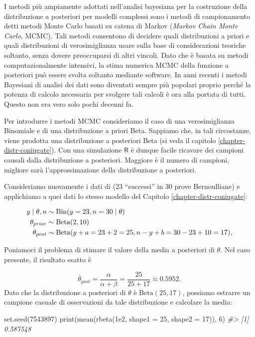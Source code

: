 \documentclass[
  11pt,
]{krantz}
\makeatletter
\newenvironment{Shaded}{\begin{snugshade}}{\end{snugshade}}
\newcommand{\AttributeTok}[1]{\textcolor[rgb]{0.61,0.61,0.61}{#1}}
\newcommand{\CommentTok}[1]{\textcolor[rgb]{0.37,0.37,0.37}{\textit{#1}}}
\newcommand{\DecValTok}[1]{\textcolor[rgb]{0.06,0.06,0.06}{#1}}
\newcommand{\FloatTok}[1]{\textcolor[rgb]{0.06,0.06,0.06}{#1}}
\newcommand{\FunctionTok}[1]{\textcolor[rgb]{0,0,0}{#1}}
\newcommand{\NormalTok}[1]{#1}
\newenvironment{kframe}{%
\medskip{}
\setlength{\fboxsep}{.8em}
 \def\at@end@of@kframe{}%
 \ifinner\ifhmode%
  \def\at@end@of@kframe{\end{minipage}}%
  \begin{minipage}{\columnwidth}%
 \fi\fi%
 \def\FrameCommand##1{\hskip\@totalleftmargin \hskip-\fboxsep
 \colorbox{shadecolor}{##1}\hskip-\fboxsep
     \hskip-\linewidth \hskip-\@totalleftmargin \hskip\columnwidth}%
 \MakeFramed {\advance\hsize-\width
   \@totalleftmargin\z@ \linewidth\hsize
   \@setminipage}}%
 {\par\unskip\endMakeFramed%
 \at@end@of@kframe}
\renewenvironment{Shaded}{\begin{kframe}}{\end{kframe}}
\DeclareMathOperator{\Bin}{Bin} %
\newcommand{\R}{\textsf{R}} %
\theoremstyle{definition}
\theoremstyle{definition}
\theoremstyle{definition}
\theoremstyle{definition}
\theoremstyle{remark}
\makeatother
\begin{document}
I metodi più ampiamente adottati nell'analisi bayesiana per la costruzione della distribuzione a posteriori per modelli complessi sono i metodi di campionamento detti metodi Monte Carlo basati su catena di Markov (\emph{Markov Chain Monte Carlo}, MCMC). Tali metodi consentono di decidere quali distribuzioni a priori e quali distribuzioni di verosimiglianza usare sulla base di considerazioni teoriche soltanto, senza dovere preoccuparsi di altri vincoli. Dato che è basata su metodi computazionalmente intensivi, la stima numerica MCMC della funzione a posteriori può essere svolta soltanto mediante software. In anni recenti i metodi Bayesiani di analisi dei dati sono diventati sempre più popolari proprio perché la potenza di calcolo necessaria per svolgere tali calcoli è ora alla portata di tutti. Questo non era vero solo pochi decenni fa.

Per introdurre i metodi MCMC consideriamo il caso di una verosimiglianza Binomiale e di una distribuzione a priori Beta. Sappiamo che, in tali circostanze, viene prodotta una distribuzione a posteriori Beta (si veda il capitolo \ref{chapter-distr-coniugate}). Con una simulazione \(\R\) è dunque facile ricavare dei campioni causali dalla distribuzione a posteriori. Maggiore è il numero di campioni, migliore sarà l'approssimazione della distribuzione a posteriori.

Consideriamo nuovamente i dati di \citet{zetschefuture2019} (23 ``successi'' in 30 prove Bernoulliane) e applichiamo a quei dati lo stesso modello del Capitolo \ref{chapter-distr-coniugate}:

\begin{align}
y \mid \theta, n &\sim \Bin(y = 23, n = 30 \mid \theta) \notag\\
\theta_{prior} &\sim \mbox{Beta}(2, 10) \notag\\
\theta_{post}  &\sim \mbox{Beta}(y + a = 23 + 2 = 25, n - y + b = 30 - 23 + 10 = 17), \notag
\end{align}

Poniamoci il problema di stimare il valore della media a posteriori di \(\theta\). Nel caso presente, il risultato esatto è

\[
\bar{\theta}_{post} = \frac{\alpha}{\alpha + \beta} = \frac{25}{25 + 17} \approx 0.5952.
\] Dato che la distribuzione a posteriori di \(\theta\) è \(\mbox{Beta}(25, 17)\), possiamo estrarre un campione casuale di osservazioni da tale distribuzione e calcolare la media:

\begin{Shaded}
\begin{Highlighting}[]
\FunctionTok{set.seed}\NormalTok{(}\DecValTok{7543897}\NormalTok{)}
\FunctionTok{print}\NormalTok{(}\FunctionTok{mean}\NormalTok{(}\FunctionTok{rbeta}\NormalTok{(}\FloatTok{1e2}\NormalTok{, }\AttributeTok{shape1 =} \DecValTok{25}\NormalTok{, }\AttributeTok{shape2 =} \DecValTok{17}\NormalTok{)), }\DecValTok{6}\NormalTok{)}
\CommentTok{\#\textgreater{} [1] 0.587548}
\end{Highlighting}
\end{Shaded}
\end{document}
